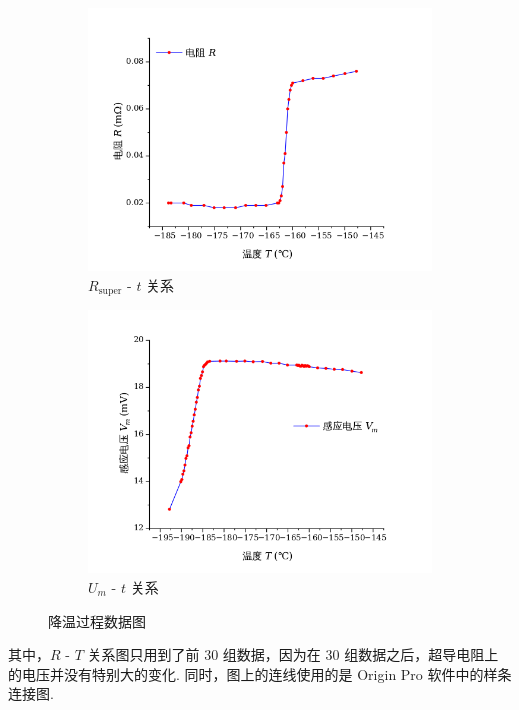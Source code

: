 \documentclass{THUexprep}
\begin{document}
\begin{figure}[H]
    \centering
    \begin{subfigure}{0.45\textwidth}
        \centering
        \includegraphics[width=\textwidth]{R-T1.png}
        \caption{$R_\text{super}$ - $t$ 关系}
    \end{subfigure}
    \begin{subfigure}{0.45\textwidth}
        \centering
        \includegraphics[width=\textwidth]{V_m-T1.png}
        \caption{$U_m$ - $t$ 关系}
    \end{subfigure}
    \caption{降温过程数据图}
\end{figure}

其中，$R$ - $T$ 关系图只用到了前 $30$ 组数据，因为在 $30$ 组数据之后，超导电阻上的电压并没有特别大的变化. 同时，图上的连线使用的是 Origin Pro 软件中的样条连接图.
\end{document}

